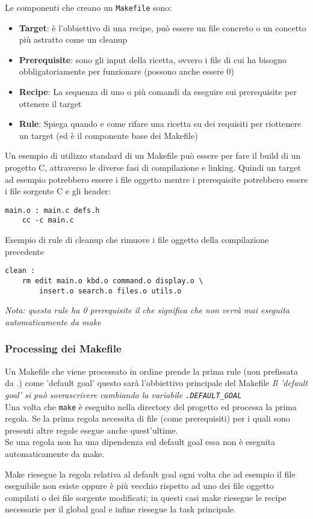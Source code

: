 \documentclass{article}
\begin{document}
Le componenti che creano un \texttt{Makefile} sono:
\begin{itemize}
    \item \textbf{Target}: è l'obbiettivo di una recipe, può essere un file concreto o un concetto più astratto come un cleanup
    \item \textbf{Prerequisite}: sono gli input della ricetta, ovvero i file di cui ha bisogno obbligatoriamente per funzionare (possono anche essere 0)
    \item \textbf{Recipe}: La sequenza di uno o più comandi da eseguire sui prerequisite per ottenere il target
    \item \textbf{Rule}: Spiega quando e come rifare una ricetta su dei requisiti per riottenere un target (ed è il componente base dei Makefile)
\end{itemize}

Un esempio di utilizzo standard di un Makefile può essere per fare il build di un progetto C, attraverso le diverse fasi di compilazione e linking.
Quindi un target ad esempio potrebbero essere i file oggetto mentre i prerequisite potrebbero essere i file sorgente C e gli header:
\begin{lstlisting}
main.o : main.c defs.h
	cc -c main.c
\end{lstlisting}

Esempio di rule di cleanup che rimuove i file oggetto della compilazione precedente
\begin{lstlisting}
clean :
    rm edit main.o kbd.o command.o display.o \
        insert.o search.o files.o utils.o
\end{lstlisting}
\textit{Nota: questa rule ha 0 prerequisite il che significa che non verrà mai eseguita automaticamente da make}

\subsubsection*{Processing dei Makefile}
Un Makefile che viene processato in ordine prende la prima rule (non prefissata da .) 
come 'default goal' questo sarà l'obbiettivo principale del Makefile
\textit{Il 'default goal' si può sovrascrivere cambiando la variabile \texttt{.DEFAULT\_GOAL}}\\

Una volta che \texttt{make} è eseguito nella directory del progetto ed processa la prima regola.
Se la prima regola necessita di file (come prerequisiti) 
per i quali sono presenti altre regole esegue anche quest'ultime.\\
Se una regola non ha una dipendenza sul default goal essa non è eseguita automaticamente da make.

Make riesegue la regola relativa al default goal ogni volta che ad esempio il file eseguibile 
non esiste oppure è più vecchio rispetto ad uno dei file oggetto compilati 
o dei file sorgente modificati; in questi casi make riesegue le recipe necessarie per il global goal 
e infine riesegue la task principale.
\end{document}
